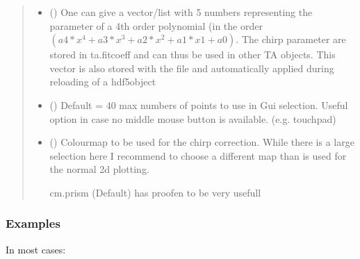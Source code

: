 \documentclass[letterpaper,10pt,english]{sphinxmanual}
\begin{document}
\begin{fulllineitems}
\begin{fulllineitems}
\begin{quote}
\begin{description}
\begin{itemize}
\item {} 
 (\sphinxstyleliteralemphasis{\sphinxupquote{ (}}\sphinxstyleliteralemphasis{\sphinxupquote{)}}\sphinxstyleliteralemphasis{\sphinxupquote{, }}) \textendash{} One can give a vector/list with 5 numbers representing the parameter
of a 4th order polynomial (in the order
\((a4*x^4 + a3*x^3+a2*x^2+a1*x1+a0)\). The chirp parameter are
stored in ta.fitcoeff and can thus be used in other TA objects. This
vector is also stored with the file and automatically applied during
re\sphinxhyphen{}loading of a hdf5\sphinxhyphen{}object

\item {} 
 (\sphinxstyleliteralemphasis{\sphinxupquote{, }}) \textendash{} Default = 40 max numbers of points to use in Gui selection. Useful option in case no middle mouse button
is available. (e.g. touchpad)

\item {} 
 (\sphinxstyleliteralemphasis{\sphinxupquote{, }}) \textendash{} 
Colourmap to be used for the chirp correction. While there is a large selection here I recommend to choose
a different map than is used for the normal 2d plotting.

cm.prism (Default) has proofen to be very usefull


\end{itemize}

\end{description}\end{quote}
\subsubsection*{Examples}

In most cases:

\begin{sphinxVerbatim}[commandchars=\\\{\}]
   
   
\end{sphinxVerbatim}


\end{fulllineitems}
\end{fulllineitems}
\end{document}
